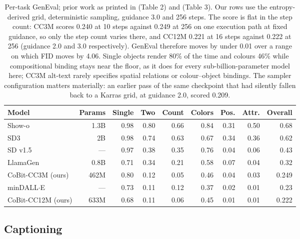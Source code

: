 \begin{table}[tb]
\centering
\small
\begin{tabular}{lrrrrrrrr}
\toprule
\textbf{Model} & \textbf{Params} & Single & Two & Count & Colors & Pos. & Attr. & \textbf{Overall} \\
\midrule
Show-o \citep{image:showo} & 1.3B & 0.98 & 0.80 & 0.66 & 0.84 & 0.31 & 0.50 & 0.68 \\
SD3 & 2B & 0.98 & 0.74 & 0.63 & 0.67 & 0.34 & 0.36 & 0.62 \\
SD v1.5 & --- & 0.97 & 0.38 & 0.35 & 0.76 & 0.04 & 0.06 & 0.43 \\
LlamaGen & 0.8B & 0.71 & 0.34 & 0.21 & 0.58 & 0.07 & 0.04 & 0.32 \\
CoBit-CC3M (ours) & 462M & 0.80 & 0.12 & 0.05 & 0.46 & 0.04 & 0.03 & 0.249 \\
minDALL$\cdot$E & --- & 0.73 & 0.11 & 0.12 & 0.37 & 0.02 & 0.01 & 0.23 \\
CoBit-CC12M (ours) & 633M & 0.68 & 0.11 & 0.06 & 0.45 & 0.01 & 0.01 & 0.222 \\
\bottomrule
\end{tabular}
\caption{Per-task GenEval; prior work as printed in \citet{image:geneval} (Table 2) and
\citet{image:showo} (Table 3). Our rows use the entropy-derived grid, deterministic sampling,
guidance 3.0 and 256 steps. The score is flat in the step count: CC3M scores 0.240 at 10 steps against
0.249 at 256 on one execution path at fixed guidance, so only the step count varies there, and
CC12M 0.221 at 16 steps against 0.222 at 256 (guidance 2.0 and 3.0 respectively). GenEval
therefore moves by under 0.01 over a range on which FID moves by 4.06.
Single objects render 80\% of the time and colours 46\% while compositional binding stays near the
floor, as it does for every sub-billion-parameter model here; CC3M alt-text rarely specifies
spatial relations or colour--object bindings. The sampler configuration matters materially: an
earlier pass of the same checkpoint that had silently fallen back to a Karras grid, at guidance
2.0, scored 0.209.}
\label{tab:app:image:geneval}
\end{table}

\subsection{Captioning}
\label{app:image:captioning}

